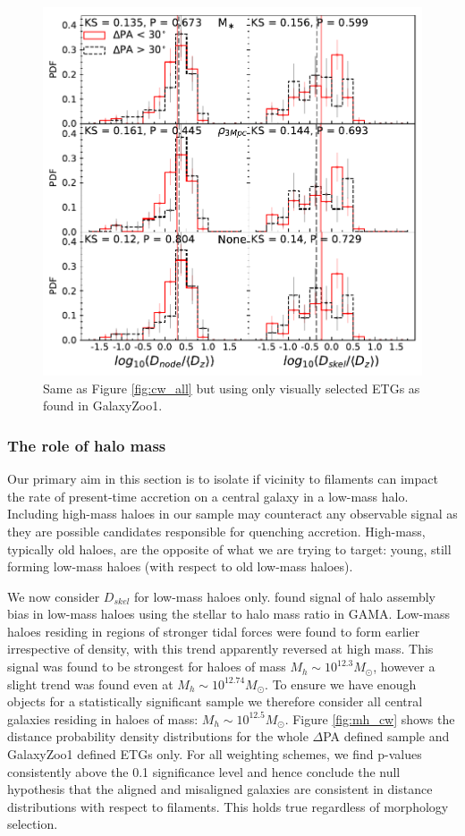 \begin{figure}
    \centering
	\includegraphics[width=0.9\linewidth]{thesis/latex/halo_assembly_manga/PA_ET_CW.pdf}
    \caption{Same as Figure \ref{fig:cw_all} but using only visually selected ETGs as found in GalaxyZoo1.}
    \label{fig:cw_et}
\end{figure}

\subsubsection{The role of halo mass} 
Our primary aim in this section is to isolate if vicinity to filaments can impact the rate of present-time accretion on a central galaxy in a low-mass halo. Including high-mass haloes in our sample may counteract any observable signal as they are possible candidates responsible for quenching accretion. High-mass, typically old haloes, are the opposite of what we are trying to target: young, still forming low-mass haloes (with respect to old low-mass haloes). 

We now consider $D_{skel}$ for low-mass haloes only. \citet{tojeiro2017} found signal of halo assembly bias in low-mass haloes using the stellar to halo mass ratio in GAMA. Low-mass haloes residing in regions of stronger tidal forces were found to form earlier irrespective of density, with this trend apparently reversed at high mass. This signal was found to be strongest for haloes of mass $M_h \sim 10^{12.3} M_{\odot}$, however a slight trend was found even at $M_h \sim 10^{12.74} M_{\odot}$. To ensure we have enough objects for a statistically significant sample we therefore consider all central galaxies residing in haloes of mass: $M_h \sim 10^{12.5} M_{\odot}$. Figure \ref{fig:mh_cw} shows the distance probability density distributions for the whole $\Delta$PA defined sample and GalaxyZoo1 defined ETGs only. For all weighting schemes, we find p-values consistently above the 0.1 significance level and hence conclude the null hypothesis that the aligned and misaligned galaxies are consistent in distance distributions with respect to filaments. This holds true regardless of morphology selection.

